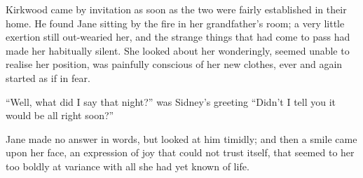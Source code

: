Kirkwood came by invitation as soon as the two were fairly established
in their home. He found Jane sitting by the fire in her grandfather's
room; a very little exertion still out-wearied her, and the strange
things that had come to pass had made her habitually silent. She looked
about her wonderingly, seemed unable to realise her position, was
painfully conscious of her new clothes, ever and again started as if in
fear.

``Well, what did I say that night?'' was Sidney's greeting ``Didn't I
tell you it would be all right soon?''

Jane made no answer in words, but looked at him timidly; and then a
smile came upon her face, an expression of joy that could not trust
itself, that seemed to her too boldly at variance with all she had yet
known of life.
